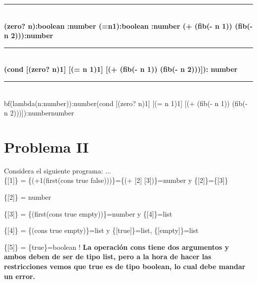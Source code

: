 \documentclass{article}
\begin{document}
\rule[-2mm]{17cm}{0.1mm}
\newline
\\
\textbf{\Gamma\vdash(zero? n):boolean \hspace{2mm} \Gamma{}:number\hspace{2mm} \Gamma\vdash(=n1):boolean \hspace{2mm} \Gamma{}:number \hspace{2mm} \Gamma\vdash(+ (fib(- n 1)) (fib(- n 2))):number}


\rule[-2mm]{12cm}{0.1mm}
\\
\newline
\textbf{\vdash(cond [(zero? n)1] [(= n 1)1] [(+ (fib(- n 1)) (fib(- n 2)))]): number}


\rule[-2mm]{19cm}{0.1mm}
\\
\newline
bf{\vdash(lambda(n:number)):number\hspace{2mm}(cond [(zero? n)1] [(= n 1)1] [(+ (fib(- n 1)) (fib(- n 2)))]):number\rightarrow number}


\section{Problema II}
Considera el siguiente programa:
...
\\

\{[1]\} = \{(+\hspace{2mm}1\hspace{2mm}(first(cons\hspace{2mm} true \hspace{2mm}false)))\}\hspace{2mm}=\{(+ [2] [3])\}=number\hspace{2mm} y \{[2]\}=\{[3]\}

\{[2]\} = number

\{[3]\} = \{(first(cons\hspace{2mm} true\hspace{2mm} empty))\}=number \hspace{2mm} y \hspace{2mm} \{[4]\}=list

\{[4]\} = \{(cons\hspace{2mm} true\hspace{2mm} empty)\}=list y \hspace{2mm}\{[true]\}=list, \hspace{2mm}\{[empty]\}=list

\{[5]\} = \{true\}=boolean !
\textbf{La operación cons tiene dos argumentos y ambos deben de ser de tipo list, pero a la hora de hacer las restricciones vemos que true es de tipo boolean, lo cual debe mandar un error.}
\end{document}
